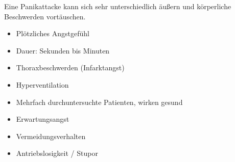 Eine Panikattacke kann sich sehr unterschiedlich äußern und
körperliche Beschwerden vortäuschen.

\begin{itemize}
    \item Plötzliches Angstgefühl
    \item Dauer: Sekunden bis Minuten
    \item Thoraxbeschwerden (Infarktangst)
    \item Hyperventilation 
    \item Mehrfach durchuntersuchte  Patienten, wirken gesund
    \item Erwartungsangst
    \item Vermeidungsverhalten
    \item Antriebslosigkeit / Stupor
\end{itemize}

















% 
% 
% 





